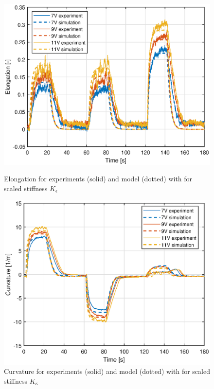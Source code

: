 \begin{figure}[H] 
    \begin{minipage}[b]{0.49\linewidth}
     \centering
    \includegraphics[width=\linewidth]{Figures/Chapter5/elongfit.eps} 
    \caption{Elongation for experiments (solid) and model (dotted) with for scaled stiffness $K_\epsilon$ } 
    \label{fig5:elong} 
       \end{minipage} 
    \begin{minipage}[b]{0.49\linewidth}
     \centering
    \includegraphics[width=\linewidth]{Figures/Chapter5/curvaturefit.eps} 
    \caption{Curvature for experiments (solid) and model (dotted) with for scaled stiffness $K_\kappa$ } 
    \label{fig5:kappa} 
    \end{minipage} 
\end{figure}

